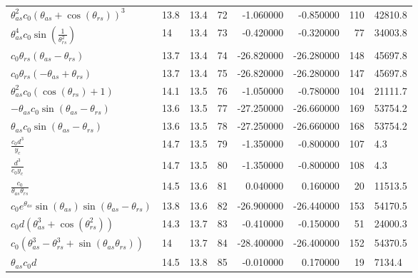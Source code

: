\begin{tabularx}{\textwidth}{lllrrrrl}
$ \theta_{as}^{2} c_{0} \left(\theta_{as} + \cos{\left(\theta_{rs} \right)}\right)^{3} $  &  13.8  &  13.4  &  72  &  -1.060000  &  -0.850000  &  110  &  42810.8  \\ 
$ \theta_{as}^{4} c_{0} \sin{\left(\displaystyle\frac{1}{\theta_{rs}^{2}} \right)} $  &  14\phantom{.0}  &  13.4  &  73  &  -0.420000  &  -0.320000  &  77  &  34003.8  \\ 
$ c_{0} \theta_{rs} \left(\theta_{as} - \theta_{rs}\right) $  &  13.7  &  13.4  &  74  &  -26.820000  &  -26.280000  &  148  &  45697.8  \\ 
$ c_{0} \theta_{rs} \left(- \theta_{as} + \theta_{rs}\right) $  &  13.7  &  13.4  &  75  &  -26.820000  &  -26.280000  &  147  &  45697.8  \\ 
$ \theta_{as}^{2} c_{0} \left(\cos{\left(\theta_{rs} \right)} + 1\right) $  &  14.1  &  13.5  &  76  &  -1.050000  &  -0.780000  &  104  &  21111.7  \\ 
$ - \theta_{as} c_{0} \sin{\left(\theta_{as} - \theta_{rs} \right)} $  &  13.6  &  13.5  &  77  &  -27.250000  &  -26.660000  &  169  &  53754.2  \\ 
$ \theta_{as} c_{0} \sin{\left(\theta_{as} - \theta_{rs} \right)} $  &  13.6  &  13.5  &  78  &  -27.250000  &  -26.660000  &  168  &  53754.2  \\ 
$ \displaystyle\frac{c_{0} d^{3}}{y_c} $  &  14.7  &  13.5  &  79  &  -1.350000  &  -0.800000  &  107  &  4.3  \\ 
$ \displaystyle\frac{d^{3}}{c_{0} y_c} $  &  14.7  &  13.5  &  80  &  -1.350000  &  -0.800000  &  108  &  4.3  \\ 
$ \displaystyle\frac{c_{0}}{\theta_{as} \theta_{rs}} $  &  14.5  &  13.6  &  81  &  0.040000  &  0.160000  &  20  &  11513.5  \\ 
$ c_{0} e^{\theta_{as}} \sin{\left(\theta_{as} \right)} \sin{\left(\theta_{as} - \theta_{rs} \right)} $  &  13.8  &  13.6  &  82  &  -26.900000  &  -26.440000  &  153  &  54170.5  \\ 
$ c_{0} d \left(\theta_{as}^{3} + \cos{\left(\theta_{rs}^{2} \right)}\right) $  &  14.3  &  13.7  &  83  &  -0.410000  &  -0.150000  &  51  &  24000.3  \\ 
$ c_{0} \left(\theta_{as}^{3} - \theta_{rs}^{3} + \sin{\left(\theta_{as} \theta_{rs} \right)}\right) $  &  14\phantom{.0}  &  13.7  &  84  &  -28.400000  &  -26.400000  &  152  &  54370.5  \\ 
$ \theta_{as} c_{0} d $  &  14.5  &  13.8  &  85  &  -0.010000  &  0.170000  &  19  &  7134.4  \\ 

\end{tabularx}
